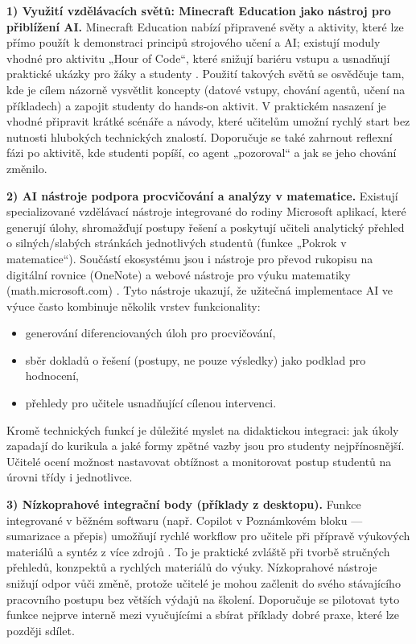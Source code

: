 \documentclass{report}%
\begin{document}
\medskip
\textbf{1) Využití vzdělávacích světů: Minecraft Education jako nástroj pro přiblížení AI.}  
Minecraft Education nabízí připravené světy a aktivity, které lze přímo použít k demonstraci principů strojového učení a AI; existují moduly vhodné pro aktivitu „Hour of Code“, které snižují bariéru vstupu a usnadňují praktické ukázky pro žáky a studenty \cite{kb_ai_101_tipu_pdf_04e4a115_page_15_2}.
Použití takových světů se osvědčuje tam, kde je cílem názorně vysvětlit koncepty (datové vstupy, chování agentů, učení na příkladech) a zapojit studenty do hands‑on aktivit.
V praktickém nasazení je vhodné připravit krátké scénáře a návody, které učitelům umožní rychlý start bez nutnosti hlubokých technických znalostí.
Doporučuje se také zahrnout reflexní fázi po aktivitě, kde studenti popíší, co agent „pozoroval“ a jak se jeho chování změnilo.

\medskip
\textbf{2) AI nástroje podpora procvičování a analýzy v matematice.}  
Existují specializované vzdělávací nástroje integrované do rodiny Microsoft aplikací, které generují úlohy, shromažďují postupy řešení a poskytují učiteli analytický přehled o silných/slabých stránkách jednotlivých studentů (funkce „Pokrok v matematice“).
Součástí ekosystému jsou i nástroje pro převod rukopisu na digitální rovnice (OneNote) a webové nástroje pro výuku matematiky (math.microsoft.com) \cite{kb_ai_101_tipu_pdf_04e4a115_page_8_1}.
Tyto nástroje ukazují, že užitečná implementace AI ve výuce často kombinuje několik vrstev funkcionality:
\begin{itemize}
  \item generování diferenciovaných úloh pro procvičování,
  \item sběr dokladů o řešení (postupy, ne pouze výsledky) jako podklad pro hodnocení,
  \item přehledy pro učitele usnadňující cílenou intervenci.
\end{itemize}
Kromě technických funkcí je důležité myslet na didaktickou integraci: jak úkoly zapadají do kurikula a jaké formy zpětné vazby jsou pro studenty nejpřínosnější.
Učitelé ocení možnost nastavovat obtížnost a monitorovat postup studentů na úrovni třídy i jednotlivce.

\medskip
\textbf{3) Nízkoprahové integrační body (příklady z desktopu).}  
Funkce integrované v běžném softwaru (např. Copilot v Poznámkovém bloku — sumarizace a přepis) umožňují rychlé workflow pro učitele při přípravě výukových materiálů a syntéz z více zdrojů \cite{kb_ai_101_tipu_pdf_04e4a115_page_14_1}.
To je praktické zvláště při tvorbě stručných přehledů, konzpektů a rychlých materiálů do výuky.
Nízkoprahové nástroje snižují odpor vůči změně, protože učitelé je mohou začlenit do svého stávajícího pracovního postupu bez větších výdajů na školení.
Doporučuje se pilotovat tyto funkce nejprve interně mezi vyučujícími a sbírat příklady dobré praxe, které lze později sdílet.
\end{document}
